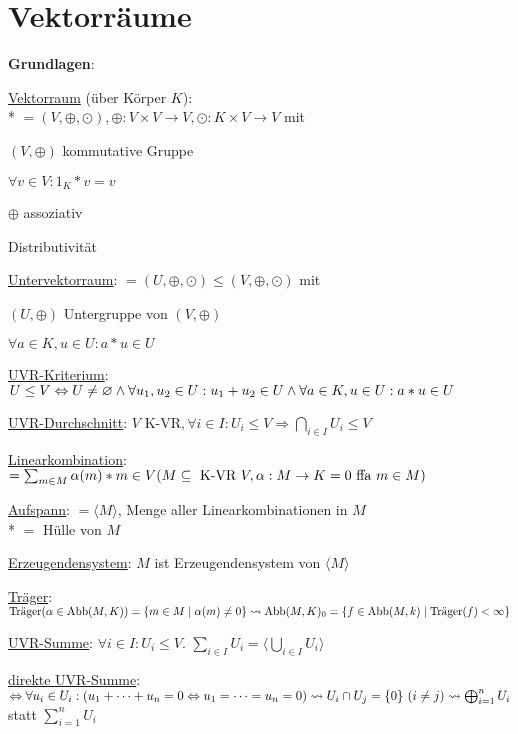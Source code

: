 \section{\label{sec:Vektorraeume}Vektorräume}

\textbf{Grundlagen}:
\begin{items}
	\item \underline{Vektorraum} (über Körper $K$): \\* $=(V,\oplus,\odot), \oplus: V \times V \rightarrow V, \odot: K \times V \rightarrow V$ mit
	\begin{enumeration}
		\item $(V,\oplus)$ kommutative Gruppe
		\item $\forall v \in V: 1_K*v=v$
		\item $\oplus$ assoziativ
		\item Distributivität
	\end{enumeration}
	\item \underline{Untervektorraum}: $=(U,\oplus,\odot) \leq (V,\oplus,\odot)$ mit
	\begin{enumeration}
		\item $(U,\oplus)$ Untergruppe von $(V,\oplus)$
		\item $\forall a \in K, u \in U: a*u \in U$
	\end{enumeration}
	\item \underline{UVR-Kriterium}: $U \leq V \\* \Leftrightarrow U \neq \varnothing \wedge \forall u_1, u_2 \in U: u_1+u_2 \in U \wedge \forall a \in K, u \in U: a*u \in U$
	\item \underline{UVR-Durchschnitt}: $V \text{ K-VR}, \forall i \in I: U_i \leq V \Rightarrow \bigcap_{i \in I} U_i \leq V$
	\item \underline{Linearkombination}: $=\sum_{m \in M} \alpha(m)*m \in V \\* (M \subseteq \text{ K-VR } V, \alpha: M \rightarrow K=0 \text{ ffa } m \in M)$
	\item \underline{Aufspann}: $=\langle M \rangle$, Menge aller Linearkombinationen in $M$ \\* $=$ Hülle von $M$
	\item \underline{Erzeugendensystem}: $M$ ist Erzeugendensystem von $\langle M \rangle$
	\item \underline{Träger}: $\text{Träger}(\alpha \in \text{Abb}(M,K))=\{ m \in M \mid \alpha(m) \neq 0 \} \\* \leadsto \text{Abb}(M,K)_0=\{ f \in \text{Abb}(M,k) \mid \text{Träger}(f) < \infty \}$
	\item \underline{UVR-Summe}: $\forall i \in I: U_i \leq V$. $\sum_{i \in I} U_i = \langle \bigcup_{i \in I} U_i \rangle$
	\item \underline{direkte UVR-Summe}: $\Leftrightarrow \forall u_i \in U_i : \\* (u_1 + \cdots + u_n = 0 \Leftrightarrow u_1 = \cdots = u_n = 0) \\* \leadsto U_i \cap U_j = \{ 0 \} \ (i \neq j) \\* \leadsto \bigoplus_{i=1}^n U_i$ statt $\sum_{i=1}^n U_i$
\end{items}

